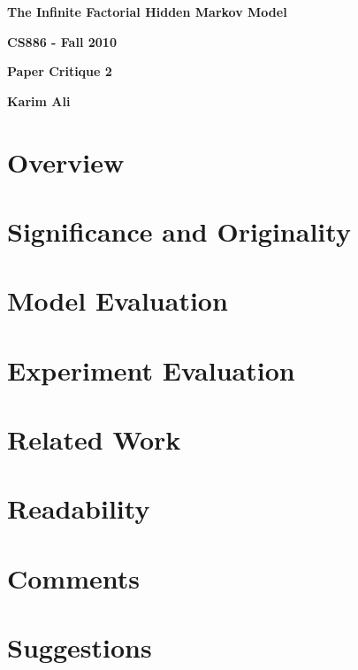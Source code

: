 \documentclass[12pt,a4paper]{article}
\begin{document}
\centerline{\sc \large \textbf{The Infinite Factorial Hidden Markov Model}}
\centerline{\textbf{CS886 - Fall 2010}}
\centerline{\textbf{Paper Critique 2}}
\centerline{\textbf{Karim Ali}}
\vspace{2pc}

\section{Overview}


\section{Significance and Originality}


\section{Model Evaluation}


\section{Experiment Evaluation}


\section{Related Work}


\section{Readability}


\section{Comments}


\section{Suggestions}
\end{document}
